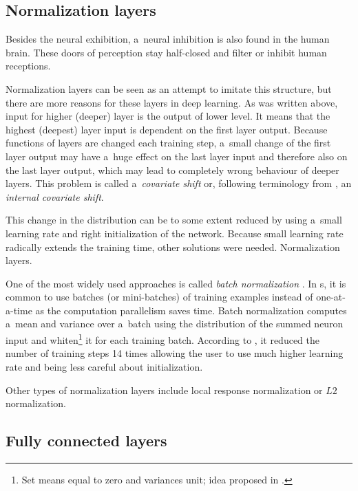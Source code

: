 \subsection{Normalization layers}
\label{norm-layers}

Besides the neural exhibition, a~neural inhibition is also found in the human
brain. These doors of perception stay half-closed and filter or inhibit human
receptions.

Normalization layers can be seen as an attempt to imitate this structure, but 
there are more reasons for these layers in deep learning. As was written above, 
input for higher (deeper) layer is the output of lower level. It means that the 
highest (deepest) layer input is dependent on the first layer output. Because 
functions of layers are changed each training step, a~small change of the first 
layer output may have a~huge effect on the last layer input and therefore also on 
the last layer output, which may lead to completely wrong behaviour of deeper 
layers. This problem is called a~\textit{covariate shift} or, following 
terminology from \cite{batch-norm}, an \textit{internal covariate shift}. 

This change in the distribution can be to some extent reduced by using a~small 
learning rate and right initialization of the network. Because small learning 
rate radically extends the training time, other solutions were needed. 
Normalization layers. 

One of the most widely used approaches is called \textit{batch normalization} 
\cite{batch-norm}. In s, it is common to use batches (or mini-batches) 
of training examples instead of one-at-a-time as the computation parallelism 
saves time. Batch normalization computes a~mean and variance over a~batch using 
the distribution of the summed neuron input and whiten\footnote{Set means equal 
to zero and variances unit; idea proposed in \cite{tricks}.} it for each 
training batch. According to \cite{batch-norm}, it reduced the number of 
training steps 14 times allowing the user to use much higher learning rate and 
being less careful about initialization.

Other types of normalization layers include local response normalization or 
$L2$ normalization.

\subsection{Fully connected layers}
\label{fc-layers}

